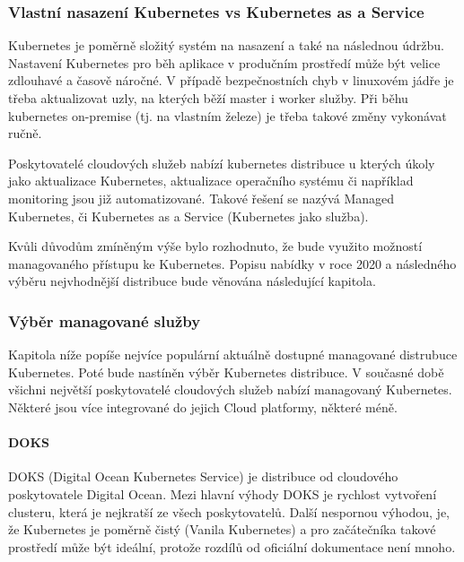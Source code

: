 \documentclass[thesis=M,czech]{FITthesis}[2019/12/23]
\theoremstyle{plain}
\theoremstyle{definition}
\begin{document}






\subsubsection{Vlastní nasazení Kubernetes vs Kubernetes as a Service}

Kubernetes je poměrně složitý systém na nasazení a také na následnou údržbu. Nastavení Kubernetes pro běh aplikace v produčním prostředí může být velice zdlouhavé a časově náročné. V případě bezpečnostních chyb v linuxovém jádře je třeba aktualizovat uzly, na kterých běží master i worker služby. Při běhu kubernetes on-premise (tj. na vlastním železe) je třeba takové změny vykonávat ručně.

Poskytovatelé cloudových služeb nabízí kubernetes distribuce u kterých úkoly jako aktualizace Kubernetes, aktualizace operačního systému či například monitoring jsou již automatizované. Takové řešení se nazývá Managed Kubernetes, či Kubernetes as a Service (Kubernetes jako služba). 

Kvůli důvodům zmíněným výše bylo rozhodnuto, že bude využito možností managovaného přístupu ke Kubernetes. Popisu nabídky v roce 2020 a následného výběru nejvhodnější distribuce bude věnována následující kapitola.


\subsubsection{Výběr managované služby}


Kapitola níže popíše nejvíce populární aktuálně dostupné managované distrubuce Kubernetes. Poté bude nastíněn výběr Kubernetes distribuce. V současné době všichni největší poskytovatelé cloudových služeb nabízí managovaný Kubernetes. Některé jsou více integrované do jejich Cloud platformy, některé méně. 

\paragraph{DOKS}

DOKS (Digital Ocean Kubernetes Service)\cite{doks} je distribuce od cloudového poskytovatele Digital Ocean. Mezi hlavní výhody DOKS je rychlost vytvoření clusteru, která je nejkratší ze všech poskytovatelů. Další nespornou výhodou, je, že Kubernetes je poměrně čistý (Vanila Kubernetes) a pro začátečníka takové prostředí může být ideální, protože rozdílů od oficiální dokumentace není mnoho. 
\end{document}

